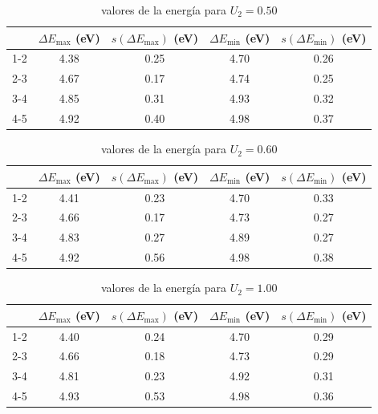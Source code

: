 \documentclass[12pt,a4paper]{article}
\numberwithin{equation}{section}
\numberwithin{figure}{section}
\begin{document}
 
 
\begin{table}[h!] \centering 
\begin{tabular}{ccccc} 
\hline  & $ \Delta E_{\max} $ (eV) & $s(\Delta E_{\max})$ (eV) & $ \Delta E_{\min} $ (eV) & $s(\Delta E_{\min})$ (eV) \\ \hline 
1-2 & 4.38 & 0.25 & 4.70 & 0.26 \\ 
2-3 & 4.67 & 0.17 & 4.74 & 0.25 \\ 
3-4 & 4.85 & 0.31 & 4.93 & 0.32 \\ 
4-5 & 4.92 & 0.40 & 4.98 & 0.37 \\ 
\hline 
\end{tabular}\caption{valores de la energía para $U_2=0.50$} 
\label{Tab:E-parabola-2} 
\end{table} 

 
 
\begin{table}[h!] \centering 
\begin{tabular}{ccccc} 
\hline  & $ \Delta E_{\max} $ (eV) & $s(\Delta E_{\max})$ (eV) & $ \Delta E_{\min} $ (eV) & $s(\Delta E_{\min})$ (eV) \\ \hline 
1-2 & 4.41 & 0.23 & 4.70 & 0.33 \\ 
2-3 & 4.66 & 0.17 & 4.73 & 0.27 \\ 
3-4 & 4.83 & 0.27 & 4.89 & 0.27 \\ 
4-5 & 4.92 & 0.56 & 4.98 & 0.38 \\ 
\hline 
\end{tabular}\caption{valores de la energía para $U_2=0.60$} 
\label{Tab:E-parabola-3} 
\end{table} 

 
 
\begin{table}[h!] \centering 
\begin{tabular}{ccccc} 
\hline  & $ \Delta E_{\max} $ (eV) & $s(\Delta E_{\max})$ (eV) & $ \Delta E_{\min} $ (eV) & $s(\Delta E_{\min})$ (eV) \\ \hline 
1-2 & 4.40 & 0.24 & 4.70 & 0.29 \\ 
2-3 & 4.66 & 0.18 & 4.73 & 0.29 \\ 
3-4 & 4.81 & 0.23 & 4.92 & 0.31 \\ 
4-5 & 4.93 & 0.53 & 4.98 & 0.36 \\ 
\hline 
\end{tabular}\caption{valores de la energía para $U_2=1.00$} 
\label{Tab:E-parabola-4} 
\end{table} 
\end{document}
